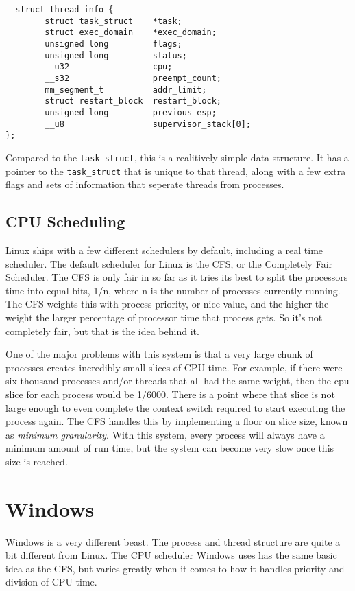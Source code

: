 \documentclass[10pt,letterpaper,onecolumn,draftclsnofoot]{IEEEtran}
\begin{document}
\begin{lstlisting}
  struct thread_info {
        struct task_struct    *task;
        struct exec_domain    *exec_domain;
        unsigned long         flags;
        unsigned long         status;
        __u32                 cpu;
        __s32                 preempt_count;
        mm_segment_t          addr_limit;
        struct restart_block  restart_block;
        unsigned long         previous_esp;
        __u8                  supervisor_stack[0];
};
\end{lstlisting}

Compared to the \texttt{task\_struct}, this is a realitively simple data structure.
It has a pointer to the \texttt{task\_struct} that is unique to that thread,
along with a few extra flags and sets of information that seperate threads from
processes.

  \subsection{CPU Scheduling}
Linux ships with a few different schedulers by default, including a real time
scheduler.\cite{redhat2016} The default scheduler for Linux is the CFS, or
the Completely Fair Scheduler.
The CFS is only fair in so far as it tries its best to split the processors time
into equal bits, 1/n, where n is the number of processes currently running. The
CFS weights this with process priority, or nice value, and the higher the weight
the larger percentage of processor time that process gets. So it's not completely
fair, but that is the idea behind it.

One of the major problems with this system is that a very large chunk of processes
creates incredibly small slices of CPU time. For example, if there were six-thousand
processes and/or threads that all had the same weight, then the cpu slice for
each process would be 1/6000. There is a point where that slice is not large
enough to even complete the context switch required to start executing the process
again. The CFS handles this by implementing a floor on slice size, known as
\textit{minimum granularity}.\cite{robertlove2010} With this system, every process
will always have a minimum amount of run time, but the system can become very
slow once this size is reached.


\section{Windows}
Windows is a very different beast. The process and thread structure are quite a
bit different from Linux. The CPU scheduler Windows uses has the same basic idea
as the CFS, but varies greatly when it comes to how it handles priority and division
of CPU time.
\end{document}
